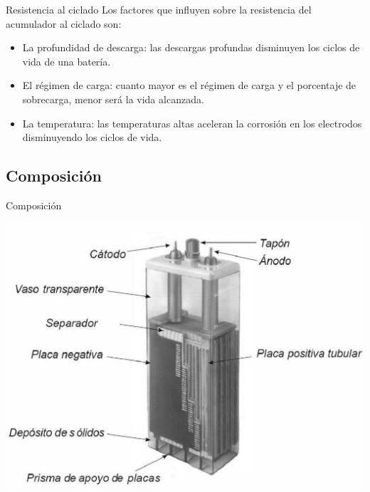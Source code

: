 \documentclass[xcolor={usenames,svgnames,dvipsnames}]{beamer}
\begin{document}
\begin{frame}[label={sec:orgca9e363}]{Resistencia al ciclado}
Los factores que influyen sobre la resistencia del acumulador al ciclado son: 
\begin{itemize}
\item \alert{La profundidad de descarga}: las descargas profundas disminuyen los ciclos de vida de una batería.

\item \alert{El régimen de carga}: cuanto mayor es el régimen de carga y el porcentaje de sobrecarga, menor será la vida alcanzada.

\item \alert{La temperatura}: las temperaturas altas aceleran la corrosión en los electrodos disminuyendo los ciclos de vida.
\end{itemize}
\end{frame}


\subsection{Composición}
\label{sec:org65118d2}

\begin{frame}[label={sec:org8228a0d}]{Composición}
\begin{center}
\includegraphics[width=.9\linewidth]{../figs/AcumuladorBN.pdf}
\end{center}
\end{frame}
\end{document}
